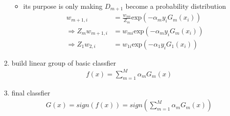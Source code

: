 \documentclass[12pt]{ctexart}%
\begin{document}
\begin{enumerate}
					\begin{itemize}
						\item its purpose is only making $D_{m+1}$ become a probability distribution
							\begin{align}
								w_{m+1, i} &= \frac{w_{mi}}{Z_m} \text{exp} (-\alpha_m y_i G_m(x_i))\\
								\Rightarrow Z_m w_{m+1, i} &= w_{mi} \text{exp} (-\alpha_m y_i G_m(x_i))\\
								\Rightarrow Z_1 w_{2, i} &= w_{1i} \text{exp} (-\alpha_1 y_i G_1(x_i))
							\end{align}
					\end{itemize}
				
				\item build linear group of basic classfier
					\begin{align}
						f(x) = \sum_{m=1}^{M} \alpha_m G_m(x)
					\end{align}
					
				\item final classfier
					\begin{align}
						G(x) = sign(f(x)) = sign \left( \sum_{m=1}^{M} \alpha_m G_m(x) \right)
					\end{align}
			\end{enumerate}
\end{document}
